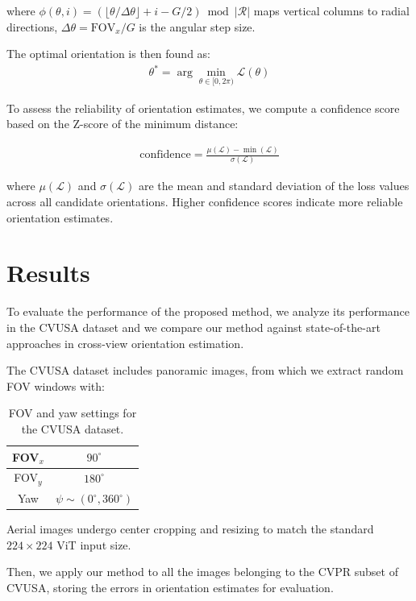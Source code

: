 \documentclass{bmvc2k}
\begin{document}
where $\phi(\theta,i) = (\lfloor\theta/\Delta\theta\rfloor + i - G/2) \bmod |\mathcal{R}|$ maps vertical columns to radial directions, $\Delta\theta = \text{FOV}_x / G$ is the angular step size.

The optimal orientation is then found as:
\begin{align}
\theta^* = \arg\min_{\theta \in [0, 2\pi)} \mathcal{L}(\theta)
\end{align}

To assess the reliability of orientation estimates, we compute a confidence score based on the Z-score of the minimum distance:

\begin{align}
\text{confidence} = \frac{\mu(\mathcal{L}) - \min(\mathcal{L})}{\sigma(\mathcal{L})}
\end{align}

where $\mu(\mathcal{L})$ and $\sigma(\mathcal{L})$ are the mean and standard deviation of the loss values across all candidate orientations. Higher confidence scores indicate more reliable orientation estimates.

\section{Results}

To evaluate the performance of the proposed method, we analyze its performance in the CVUSA dataset and we compare our method against state-of-the-art approaches in cross-view orientation estimation. 

The CVUSA dataset includes panoramic images, from which we extract random FOV windows with:

\begin{table}[H]
\centering
\begin{tabular}{c|c}
FOV$_x$ & $90^\circ$ \\
\hline
FOV$_y$ & $180^\circ$ \\
\hline
Yaw & $\psi \sim (0^\circ, 360^\circ)$ \\
\end{tabular}
\caption{FOV and yaw settings for the CVUSA dataset.}
\label{tab:cvusa_fov_yaw}
\end{table}

Aerial images undergo center cropping and resizing to match the standard $224\times224$ ViT input size.

Then, we apply our method to all the images belonging to the CVPR subset of CVUSA, storing the errors in orientation estimates for evaluation.
\end{document}
